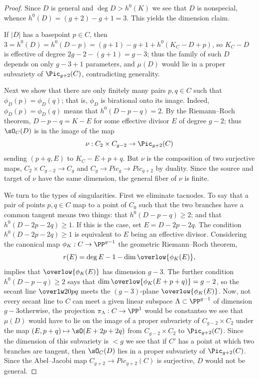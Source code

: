\begin{proof}
Since $D$ is general and $\deg D > h^{0}(K)$ we see
that $D$ is nonspecial, whence $h^0(D) = (g+2)-g+1 = 3$.
This yields the dimension claim.

If $|D|$
has
a basepoint $p\in C$, then $3=h^0(D)
= h^0(D-p) = (g+1)-g+1+h^0(K_C-D+p)$,
so $K_C-D$ is effective of degree $2g-2-(g+1) =g-3$; thus the family of
such $D$ depends on only $g-3+1$ parameters,
and $\mu(D)$ would lie in a proper subvariety of $\Pic_{g+2}(C)$,
contradicting generality.

Next we show that
there are only finitely many pairs $p,
q \in C$ such that $\phi_D(p) = \phi_D(q)$; that is, $\phi_D$
is birational onto its image.
Indeed, $\phi_D(p) = \phi_D(q)$
 means that $h^0(D-p-q) = 2$. By the Riemann--Roch
 theorem, $D-p-q = K-E$ for some effective divisor $E$ of degree $g-2$;
 thus $\sO_C(D)$ is in the image of the map
$$
\nu : C_2 \times C_{g-2} \to \Pic_{g+2}(C)
$$
sending $(p+q, E)$ to $K_C - E + p + q$.
But
$\nu$ is
the composition of two surjective maps, $C_2 \times C_{g-2} \to C_g$
and $C_g\to Pic_g \to Pic_{g+2}$ by duality. Since the source and
target of $\nu$ have the same dimension, the general fiber of $\nu$ is
finite.

We turn to the types of singularities. First we eliminate tacnodes.
To say that a pair of points $p, q \in C$ map to
a point of $C_0$ such that the
two branches have a common tangent means two things: that $h^0(D-p-q)
\geq 2$; and that $h^0(D-2p-2q) \geq 1$. If this is the case, set $E =
D - 2p - 2q$.  The condition $h^0(D-2p-2q) \geq 1$ is equivalent to
$E$ being an effective divisor. Considering the canonical map $\phi_K:
C\to \PP^{g-1}$
the
geometric Riemann--Roch theorem,
%
$$r(E) = \deg E -1-\dim\overlow{\phi_K(E)},$$
implies that $\overlow {\phi_K(E)}$ has
dimension $g-3$. The
further
condition $h^0(D-p-q) \geq 2$ says that
$\dim\overlow{\phi_K(E+p+q)} = g-2$,
so the secant line $\overlw20{pq}$ meets the $(g-3)$-plane
$\overlow{\phi_K(E)}$. Now, not every secant line to $C$ can meet
a given linear subspace $\Lambda \subset \PP^{g-1}$ of dimension
$g-3$\emdash otherwise, the projection $\pi_\Lambda : C \to \PP^1$ would
be constant\emdash so we see that $\mu(D)$ would have to lie on the image
of a proper subvariety of $C_{g-2} \times C_2$ under the map $(E, p+q)
\mapsto \sO(E+2p+2q)$ from $C_{g-2} \times C_2$ to $\Pic_{g+2}(C)$.
Since the dimension of this subvariety is $<g$ we see that if $C'$ has
a point at which two branches are tangent, then $\sO_C(D)$ lies in a
proper subvariety of $\Pic_{g+2}(C)$. Since
the Abel--Jacobi map $C_{g+2} \to Pic_{g+2}(C)$ is surjective,
 $D$ would not be general.


\end{proof}
